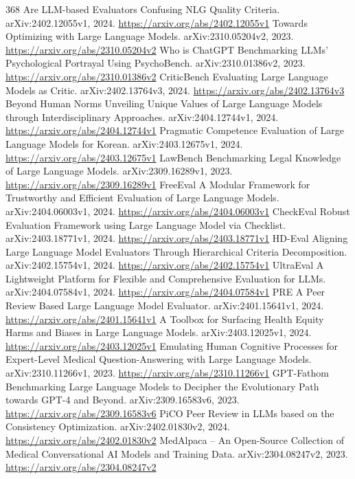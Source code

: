 \documentclass[11pt]{article}
\begin{document}
\begin{thebibliography}{368}
 Are LLM-based Evaluators Confusing NLG Quality Criteria. arXiv:2402.12055v1, 2024. \url{https://arxiv.org/abs/2402.12055v1}
 Towards Optimizing with Large Language Models. arXiv:2310.05204v2, 2023. \url{https://arxiv.org/abs/2310.05204v2}
 Who is ChatGPT Benchmarking LLMs' Psychological Portrayal Using PsychoBench. arXiv:2310.01386v2, 2023. \url{https://arxiv.org/abs/2310.01386v2}
 CriticBench Evaluating Large Language Models as Critic. arXiv:2402.13764v3, 2024. \url{https://arxiv.org/abs/2402.13764v3}
 Beyond Human Norms Unveiling Unique Values of Large Language Models through Interdisciplinary Approaches. arXiv:2404.12744v1, 2024. \url{https://arxiv.org/abs/2404.12744v1}
 Pragmatic Competence Evaluation of Large Language Models for Korean. arXiv:2403.12675v1, 2024. \url{https://arxiv.org/abs/2403.12675v1}
 LawBench Benchmarking Legal Knowledge of Large Language Models. arXiv:2309.16289v1, 2023. \url{https://arxiv.org/abs/2309.16289v1}
 FreeEval A Modular Framework for Trustworthy and Efficient Evaluation of Large Language Models. arXiv:2404.06003v1, 2024. \url{https://arxiv.org/abs/2404.06003v1}
 CheckEval Robust Evaluation Framework using Large Language Model via Checklist. arXiv:2403.18771v1, 2024. \url{https://arxiv.org/abs/2403.18771v1}
 HD-Eval Aligning Large Language Model Evaluators Through Hierarchical Criteria Decomposition. arXiv:2402.15754v1, 2024. \url{https://arxiv.org/abs/2402.15754v1}
 UltraEval A Lightweight Platform for Flexible and Comprehensive Evaluation for LLMs. arXiv:2404.07584v1, 2024. \url{https://arxiv.org/abs/2404.07584v1}
 PRE A Peer Review Based Large Language Model Evaluator. arXiv:2401.15641v1, 2024. \url{https://arxiv.org/abs/2401.15641v1}
 A Toolbox for Surfacing Health Equity Harms and Biases in Large Language Models. arXiv:2403.12025v1, 2024. \url{https://arxiv.org/abs/2403.12025v1}
 Emulating Human Cognitive Processes for Expert-Level Medical Question-Answering with Large Language Models. arXiv:2310.11266v1, 2023. \url{https://arxiv.org/abs/2310.11266v1}
 GPT-Fathom Benchmarking Large Language Models to Decipher the Evolutionary Path towards GPT-4 and Beyond. arXiv:2309.16583v6, 2023. \url{https://arxiv.org/abs/2309.16583v6}
 PiCO Peer Review in LLMs based on the Consistency Optimization. arXiv:2402.01830v2, 2024. \url{https://arxiv.org/abs/2402.01830v2}
 MedAlpaca -- An Open-Source Collection of Medical Conversational AI Models and Training Data. arXiv:2304.08247v2, 2023. \url{https://arxiv.org/abs/2304.08247v2}

\end{thebibliography}
\end{document}
